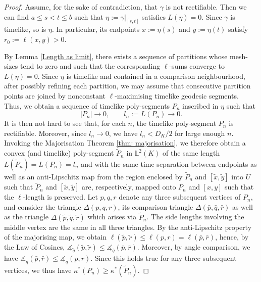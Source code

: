 \documentclass[hidelinks,12pt,a4paper]{article}
\numberwithin{equation}{section}
\theoremstyle{plain}
\theoremstyle{definition}
\newcommand{\lm}[1]{\mathbb{L}^2(#1)}
\newcommand*{\bp}{\bar{p}}
\newcommand*{\bq}{\bar{q}}
\newcommand*{\br}{\bar{r}}
\newcommand{\tp}{\tilde{p}}
\newcommand{\tq}{\tilde{q}}
\newcommand{\tx}{\tilde{x}}
\newcommand{\tr}{\tilde{r}}
\newcommand{\ty}{\tilde{y}}
\newcommand{\ma}{\ensuremath{\measuredangle}}
\begin{document}
\begin{proof}
Assume, for the sake of contradiction, that $\gamma$ is not rectifiable. 
Then we can find $a \le s < t \le b$ such that $\eta:=\gamma|_{[s,t]}$ satisfies $L(\eta)=0$.
Since $\gamma$ is timelike, so is $\eta$. 
In particular, its endpoints $x:=\eta(s)$ and $y:=\eta(t)$ satisfy $r_0:=\ell(x,y)>0$. 

By Lemma \ref{Length as limit}, there exists a sequence of partitions whose mesh-sizes tend to zero and such that the corresponding $\ell$-sums converge to $L(\eta)=0$. 
Since $\eta$ is timelike and contained in a comparison neighbourhood, after possibly refining each partition, we may assume that consecutive partition points are joined by nonconstant $\ell$-maximising timelike geodesic segments. Thus, we obtain a sequence of timelike poly-segments $P_n$ inscribed in $\eta$ such that
\[
|P_n|\to 0,
\qquad
l_n:=L(P_n)\to 0.
\]
It is then not hard to see that, for each $n$, the timelike poly-segment $P_n$ is rectifiable. 
Moreover, since $l_n \to 0$, we have $l_n<D_K/2$ for large enough $n$.
Invoking the Majorisation Theorem \ref{thm: majorisation}, we therefore obtain a convex (and timelike) poly-segment $\widetilde P_n$ in $\lm{K}$ of the same length $L(\widetilde P_n)=L(P_n)=l_n$ and with the same time separation between endpoints as well as an anti-Lipschitz map from the region enclosed by $\widetilde P_n$ and $[\tx,\ty]$ into $U$ such that $\widetilde P_n$ and $[\tx,\ty]$ are, respectively, mapped onto $P_n$ and $[x,y]$ such that the $\ell$-length is preserved. 
Let $p,q,r$ denote any three subsequent vertices of $P_n$, and consider the triangle $\Delta(p,q,r)$, its comparison triangle $\Delta(\bp,\bq,\br)$ as well as the triangle $\Delta(\tp,\tq,\tr)$ which arises via $\widetilde P_n$. 
The side lengths involving the middle vertex are the same in all three triangles. 
By the anti-Lipschitz property of the majorising map, we obtain $\ell(\tp,\tr) \leq \ell(p,r)=\ell(\bp,\br)$, hence, by the Law of Cosines, $\ma_{\tq}(\tp,\tr) \leq \ma_{\bq}(\bp,\br)$. 
Moreover, by angle comparison, we have $\ma_{\bq}(\bp,\br) \leq \ma_q(p,r)$. 
Since this holds true for any three subsequent vertices, we thus have $\kappa^*(P_n) \geq \kappa^*(\widetilde P_n)$. 


\end{proof}
\end{document}

